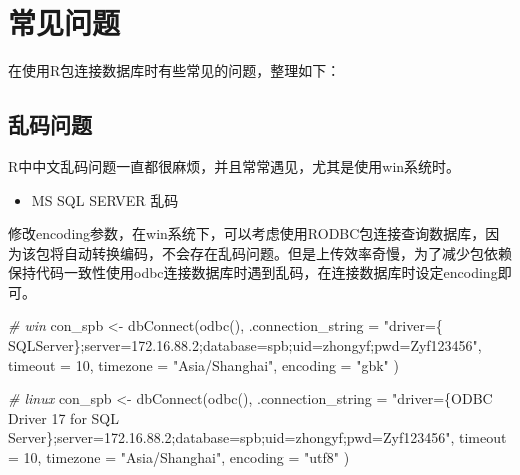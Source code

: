 \documentclass[
]{book}
\newenvironment{Shaded}{\begin{snugshade}}{\end{snugshade}}
\newcommand{\AttributeTok}[1]{\textcolor[rgb]{0.77,0.63,0.00}{#1}}
\newcommand{\CommentTok}[1]{\textcolor[rgb]{0.56,0.35,0.01}{\textit{#1}}}
\newcommand{\DecValTok}[1]{\textcolor[rgb]{0.00,0.00,0.81}{#1}}
\newcommand{\FunctionTok}[1]{\textcolor[rgb]{0.00,0.00,0.00}{#1}}
\newcommand{\NormalTok}[1]{#1}
\newcommand{\OtherTok}[1]{\textcolor[rgb]{0.56,0.35,0.01}{#1}}
\newcommand{\StringTok}[1]{\textcolor[rgb]{0.31,0.60,0.02}{#1}}
\providecommand{\tightlist}{%
  \setlength{\itemsep}{0pt}\setlength{\parskip}{0pt}}
\begin{document}
\hypertarget{ux5e38ux89c1ux95eeux9898}{%
\section{常见问题}\label{ux5e38ux89c1ux95eeux9898}}

在使用R包连接数据库时有些常见的问题，整理如下：

\hypertarget{ux4e71ux7801ux95eeux9898}{%
\subsection{乱码问题}\label{ux4e71ux7801ux95eeux9898}}

R中中文乱码问题一直都很麻烦，并且常常遇见，尤其是使用win系统时。

\begin{itemize}
\tightlist
\item
  MS SQL SERVER 乱码
\end{itemize}

修改encoding参数，在win系统下，可以考虑使用RODBC包连接查询数据库，因为该包将自动转换编码，不会存在乱码问题。但是上传效率奇慢，为了减少包依赖保持代码一致性使用odbc连接数据库时遇到乱码，在连接数据库时设定encoding即可。

\begin{Shaded}
\begin{Highlighting}[]
\CommentTok{\# win}
\NormalTok{con\_spb }\OtherTok{\textless{}{-}} \FunctionTok{dbConnect}\NormalTok{(}\FunctionTok{odbc}\NormalTok{(),}
  \AttributeTok{.connection\_string =}
    \StringTok{"driver=\{ SQLServer\};server=172.16.88.2;database=spb;uid=zhongyf;pwd=Zyf123456"}\NormalTok{, }
  \AttributeTok{timeout =} \DecValTok{10}\NormalTok{, }\AttributeTok{timezone =} \StringTok{"Asia/Shanghai"}\NormalTok{, }\AttributeTok{encoding =} \StringTok{"gbk"}
\NormalTok{)}

\CommentTok{\# linux }
\NormalTok{con\_spb }\OtherTok{\textless{}{-}} \FunctionTok{dbConnect}\NormalTok{(}\FunctionTok{odbc}\NormalTok{(),}
                     \AttributeTok{.connection\_string =}
                       \StringTok{"driver=\{ODBC Driver 17 for SQL Server\};server=172.16.88.2;database=spb;uid=zhongyf;pwd=Zyf123456"}\NormalTok{, }
                     \AttributeTok{timeout =} \DecValTok{10}\NormalTok{, }\AttributeTok{timezone =} \StringTok{"Asia/Shanghai"}\NormalTok{, }\AttributeTok{encoding =} \StringTok{"utf8"}
\NormalTok{)}
\end{Highlighting}
\end{Shaded}
\end{document}
